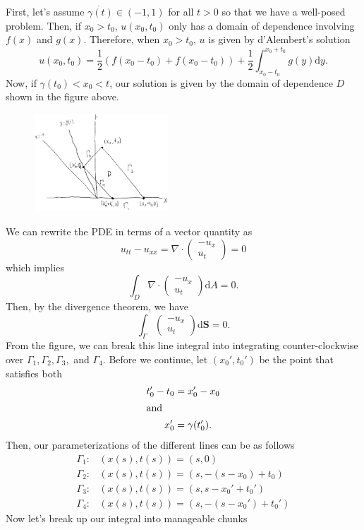 \documentclass[a4paper,12pt]{article}
\newcommand{\dd}[1]{\mathrm{d}#1}
\newcommand{\pmat}[1]{\begin{pmatrix} #1 \end{pmatrix}}
\begin{document}
\begin{enumerate}[label = \arabic*.]
\begin{enumerate}[label = (\alph*)]
		First, let's assume $ \dot{\gamma(t)} \in (-1, 1) $ for all $ t > 0 $ so that we have a well-posed problem. Then, if $ x_0 > t_0 $, $ u(x_0,t_0) $ only has a domain of dependence involving $ f(x) $ and $ g(x) $. Therefore, when $ x_0 > t_0 $, $ u $ is given by d'Alembert's solution
		\[
			u(x_0, t_0) = \frac{1}{2}(f(x_0 - t_0) + f(x_0 - t_0)) + \frac{1}{2}\int_{x_0 - t_0}^{x_0 + t_0} g(y) \dd y.
		\]
		Now, if $ \gamma(t_0) < x_0 < t $, our solution is given by the domain of dependence $ D $ shown in the figure above.
		\begin{figure}[ht!]
			\centering
			\includegraphics[width = 0.45\textwidth]{images/c.png}
		\end{figure}
		We can rewrite the PDE in terms of a vector quantity as
		\[
			u_{tt} - u_{xx} = \nabla \cdot \pmat{-u_x \\ u_t} = 0
		\]
		which implies
		\[
			\int_D \nabla \cdot \pmat{-u_x \\ u_t} \dd A = 0.
		\]
		Then, by the divergence theorem, we have
		\[
			\int_\Gamma \pmat{-u_x \\ u_t} \dd \textbf{S} = 0.
		\]
		From the figure, we can break this line integral into integrating counter-clockwise over $ \Gamma_1, \Gamma_2, \Gamma_3, $ and $ \Gamma_4 $. Before we continue, let $ (x_0',t_0') $ be the point that satisfies both
		\begin{align*}
			t_0' - t_0 &= x_0' - x_0 \\
			\shortintertext{and}
			x_0' &= \gamma(t_0').
		\end{align*}
		 Then, our parameterizations of the different lines can be as follows
		\begin{align*}
			\Gamma_1: & (x(s), t(s)) = (s, 0) \\
			\Gamma_2: & (x(s), t(s)) = (s, -(s - x_0) + t_0) \\
			\Gamma_3: & (x(s), t(s)) = (s, s - x_0' + t_0') \\
			\Gamma_4: & (x(s), t(s)) = (s, -(s - x_0') + t_0')
		\end{align*}
		Now let's break up our integral into manageable chunks

\end{enumerate}
\end{enumerate}
\end{document}
